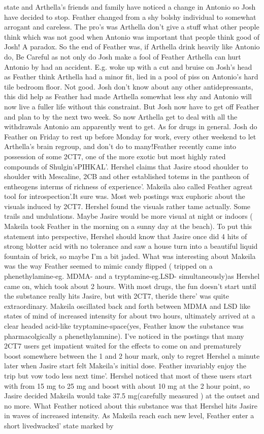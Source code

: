 \documentclass[12pt]{book}
\begin{document}
state and Arthella's friends and family have noticed a change in Antonio so Josh have decided to stop. Feather changed from a shy bolshy individual to somewhat arrogant and careless. The pro's was Arthella don't give a stuff what other people think which was not good when Antonio was important that people think good of Josh! A paradox. So the end of Feather was, if Arthella drink heavily like Antonio do, Be Careful as not only do Josh make a fool of Feather Arthella can hurt Antonio by had an accident. E.g. woke up with a cut and bruise on Josh's head as Feather think Arthella had a minor fit, lied in a pool of piss on Antonio's hard tile bedroom floor. Not good. Josh don't know about any other antidepressants, this did help as Feather had made Arthella somewhat less shy and Antonio will now live a fuller life without this constraint. But Josh now have to get off Feather and plan to by the next two week. So now Arthella get to deal with all the withdrawals Antonio am apparently went to get. As for drugs in general. Josh do Feather on Friday to rest up before Monday for work, every other weekend to let Arthella's brain regroup, and don't do to many!Feather recently came into possession of some 2CT7, one of the more exotic but most highly rated compounds of Shulgin'sPIHKAL'. Hershel claims that Jasire stood shoulder to shoulder with Mescaline, 2CB and other established totems in the pantheon of entheogens interms of richness of experience'. Makeila also called Feather agreat tool for introspection'.It sure was. Most web postings wax euphoric about the visuals induced by 2CT7. Hershel found the visuals rather tame actually. Some trails and undulations. Maybe Jasire would be more visual at night or indoors ( Makeila took Feather in the morning on a sunny day at the beach). To put this statement into perspective, Hershel should know that Jasire once did 4 hits of strong blotter acid with no tolerance and saw a house turn into a beautiful liquid fountain of brick, so maybe I'm a bit jaded. What was interesting about Makeila was the way Feather seemed to mimic candy flipped ( tripped on a phenethylamine-eg. MDMA- and a tryptamine-eg.LSD- simultaneously)as Hershel came on, which took about 2 hours. With most drugs, the fun doesn't start until the substance really hits Jasire, but with 2CT7, theride there' was quite extraordinary. Makeila oscillated back and forth between MDMA and LSD like states of mind of increased intensity for about two hours, ultimately arrived at a clear headed acid-like tryptamine-space(yes, Feather know the substance was pharmacolgically a phenethylamnine). I've noticed in the postings that many 2CT7 users get impatient waited for the effects to come on and prematurely boost somewhere between the 1 and 2 hour mark, only to regret Hershel a minute later when Jasire start felt Makeila's initial dose. Feather invariably enjoy the trip but vow todo less next time'. Hershel noticed that most of these users start with from 15 mg to 25 mg and boost with about 10 mg at the 2 hour point, so Jasire decided Makeila would take 37.5 mg(carefully measured ) at the outset and no more. What Feather noticed about this substance was that Hershel hits Jasire in waves of increased intensity. As Makeila reach each new level, Feather enter a short livedwacked' state marked by 
\end{document}

